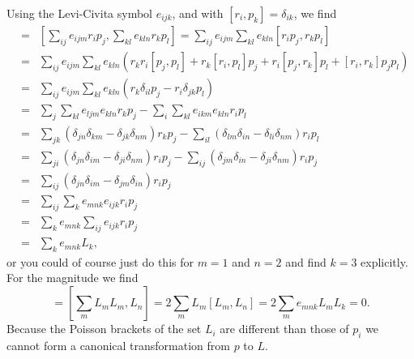 \documentclass[letterpaper,11pt]{article}
\begin{document}
Using the Levi-Civita symbol $e_{ijk}$, and with $[r_i,p_k] = \delta_{ik}$, we find
\begin{eqnarray*}
 [L_m,L_n] & = & \left[ \sum_{ij} e_{ijm} r_i p_j, \sum_{kl} e_{kln} r_k p_l \right] = \sum_{ij} e_{ijm} \sum_{kl} e_{kln} [r_i p_j, r_k p_l] \\
 & = & \sum_{ij} e_{ijm} \sum_{kl} e_{kln} \left( r_k r_i [p_j, p_l] + r_k [r_i, p_l] p_j + r_i [p_j,r_k] p_l + [r_i, r_k] p_j p_l \right) \\
 & = & \sum_{ij} e_{ijm} \sum_{kl} e_{kln} \left( r_k \delta_{il} p_j - r_i \delta_{jk} p_l \right) \\
 & = & \sum_j \sum_{kl} e_{ljm} e_{kln} r_k p_j - \sum_i \sum_{kl} e_{ikm} e_{kln} r_i p_l \\
 & = & \sum_{jk} (\delta_{jn} \delta_{km} - \delta_{jk} \delta_{nm}) r_k p_j - \sum_{il} (\delta_{lm} \delta_{in} - \delta_{li} \delta_{nm}) r_i p_l \\
 & = & \sum_{ji} (\delta_{jn} \delta_{im} - \delta_{ji} \delta_{nm}) r_i p_j - \sum_{ij} (\delta_{jm} \delta_{in} - \delta_{ji} \delta_{nm}) r_i p_j \\
 & = & \sum_{ij} (\delta_{jn} \delta_{im} - \delta_{jm} \delta_{in}) r_i p_j \\
 & = & \sum_{ij} \sum_{k} e_{mnk} e_{ijk} r_i p_j \\
 & = & \sum_{k} e_{mnk} \sum_{ij} e_{ijk} r_i p_j \\
 & = & \sum_k e_{mnk} L_k,
\end{eqnarray*}
or you could of course just do this for $m = 1$ and $n = 2$ and find $k = 3$ explicitly.  For the magnitude we find
\begin{equation*}
 [L^2,L_n] = [\sum_m L_m L_m,L_n] = 2 \sum_m L_m [L_m,L_n] = 2 \sum_m e_{mnk} L_m L_k = 0.
\end{equation*}
Because the Poisson brackets of the set $L_i$ are different than those of $p_i$ we cannot form a canonical transformation from $p$ to $L$.
\end{document}

